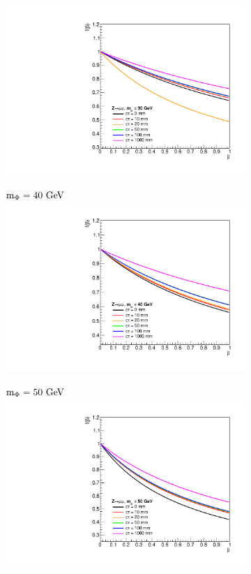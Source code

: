 \begin{figure}[htb!]
\begin{subfigure}{0.3\linewidth}
		\includegraphics[width=\linewidth]{figs/05_analysis/BR_Z_MU_30.pdf}
	\end{subfigure}
	\begin{subfigure}{0.3\linewidth}
		\centering
		$\mphi=40\unit{GeV}$
		\includegraphics[width=\linewidth]{figs/05_analysis/BR_Z_MU_40.pdf}
	\end{subfigure}
	\begin{subfigure}{0.3\linewidth}
		\centering
		$\mphi=50\unit{GeV}$
		\includegraphics[width=\linewidth]{figs/05_analysis/BR_Z_MU_50.pdf}

\end{subfigure}
\end{figure}
